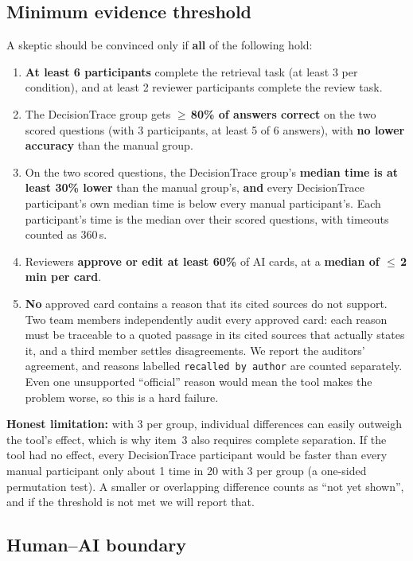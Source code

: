 \documentclass[11pt,a4paper]{article}
\newcommand{\code}[1]{\texttt{#1}}
\begin{document}
\subsection{Minimum evidence threshold}\label{sec:threshold}

A skeptic should be convinced only if \textbf{all} of the following hold:
\begin{enumerate}
  \item \textbf{At least 6 participants} complete the retrieval task (at least 3 per condition), and at least 2 reviewer participants complete the review task.
  \item The DecisionTrace group gets \textbf{$\geq$\,80\% of answers correct} on the two scored questions (with 3 participants, at least 5 of 6 answers), with \textbf{no lower accuracy} than the manual group.
  \item On the two scored questions, the DecisionTrace group's \textbf{median time is at least 30\% lower} than the manual group's, \textbf{and} every DecisionTrace participant's own median time is below every manual participant's. Each participant's time is the median over their scored questions, with timeouts counted as 360\,s.
  \item Reviewers \textbf{approve or edit at least 60\%} of AI cards, at a \textbf{median of $\leq$\,2 min per card}.
  \item \textbf{No} approved card contains a reason that its cited sources do not support. Two team members independently audit every approved card: each reason must be traceable to a quoted passage in its cited sources that actually states it, and a third member settles disagreements. We report the auditors' agreement, and reasons labelled \code{recalled by author} are counted separately. Even one unsupported ``official'' reason would mean the tool makes the problem worse, so this is a hard failure.
\end{enumerate}

\textbf{Honest limitation:} with 3 per group, individual differences can easily outweigh the tool's effect, which is why item~3 also requires complete separation. If the tool had no effect, every DecisionTrace participant would be faster than every manual participant only about 1 time in 20 with 3 per group (a one-sided permutation test). A smaller or overlapping difference counts as ``not yet shown'', and if the threshold is not met we will report that.

\subsection{Human--AI boundary}
\end{document}
